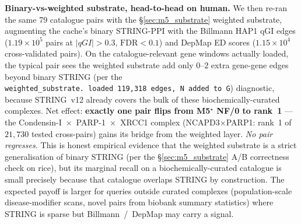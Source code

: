 \textbf{Binary-vs-weighted substrate, head-to-head on human.}
We then re-ran the same 79 catalogue pairs with the
§\ref{sec:m5_substrate} weighted substrate, augmenting the cache's
binary STRING-PPI with the Billmann HAP1 qGI edges
($1.19\times 10^5$ pairs at $|qGI|>0.3$, $\mathrm{FDR}<0.1$) and
DepMap ED scores ($1.15\times 10^4$ cross-validated pairs). On the
catalogue-relevant gene windows actually loaded, the typical pair sees
the weighted substrate add only $0$--$2$ extra gene-gene edges beyond
binary STRING (per the
\texttt{weighted\_substrate.~loaded~119,318~edges,~N~added~to~G})
diagnostic, because STRING~v12 already covers the bulk of these
biochemically-curated complexes. Net effect: \textbf{exactly one pair
flips from M5$^\star$ NF/0 to rank~1} --- the
Condensin-I~$\times$~PARP-1~$\times$~XRCC1 complex
(NCAPD3$\times$PARP1: rank~1 of $21{,}730$ tested cross-pairs) gains
its bridge from the weighted layer. \emph{No pair regresses.} This is
honest empirical evidence that the weighted substrate is a strict
generalisation of binary STRING (per the §\ref{sec:m5_substrate} A/B
correctness check on rice), but its marginal recall on a
biochemically-curated catalogue is small precisely because that
catalogue overlaps STRING by construction. The expected payoff is
larger for queries outside curated complexes (population-scale
disease-modifier scans, novel pairs from biobank summary statistics)
where STRING is sparse but Billmann~/~DepMap may carry a signal.

